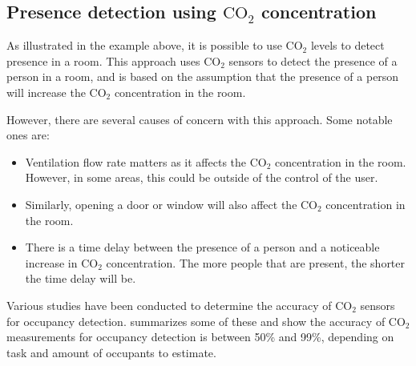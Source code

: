 \subsection{Presence detection using $\text{CO}_{2}$ concentration}\label{sec:presence_env_co2}
As illustrated in the example above, it is possible to use $\text{CO}_{2}$ levels to detect presence in a room.
This approach uses $\text{CO}_{2}$ sensors to detect the presence of a person in a room, and is based on the assumption that the presence of a person will increase the $\text{CO}_{2}$ concentration in the room.\cite{gruberCO2SensorsOccupancy2014}

However, there are several causes of concern with this approach. Some notable ones are:
\begin{itemize}
    \item Ventilation flow rate matters as it affects the $\text{CO}_{2}$ concentration in the room. However, in some areas, this could be outside of the control of the user.
    \item Similarly, opening a door or window will also affect the $\text{CO}_{2}$ concentration in the room.
    \item There is a time delay between the presence of a person and a noticeable increase in $\text{CO}_{2}$ concentration. The more people that are present, the shorter the time delay will be.
\end{itemize}
\cite{gruberCO2SensorsOccupancy2014,longoAccurateOccupancyEstimation2019}

Various studies have been conducted to determine the accuracy of $\text{CO}_{2}$ sensors for occupancy detection. 
\citeauthor{longoAccurateOccupancyEstimation2019}\cite{longoAccurateOccupancyEstimation2019} summarizes some of these and show the accuracy of $\text{CO}_{2}$ measurements for occupancy detection is between 50\% and 99\%, depending on task and amount of occupants to estimate.